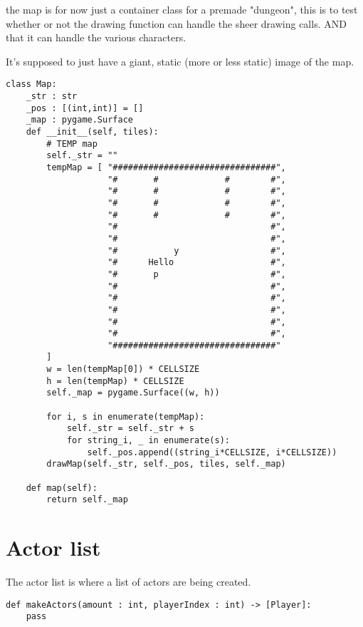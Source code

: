 \documentclass[11pt]{article}
\begin{document}
the map is for now just a container class for a premade "dungeon", this is to test whether or not the drawing function can handle the sheer drawing calls. AND that it can handle the various characters.

It's supposed to just have a giant, static (more or less static) image of the map.

\begin{verbatim}
class Map:
    _str : str
    _pos : [(int,int)] = []
    _map : pygame.Surface
    def __init__(self, tiles):
        # TEMP map
        self._str = ""
        tempMap = [ "################################",
                    "#       #             #        #",
                    "#       #             #        #",
                    "#       #             #        #",
                    "#       #             #        #",
                    "#                              #",
                    "#                              #",
                    "#           y                  #",
                    "#      Hello                   #",
                    "#       p                      #",
                    "#                              #",
                    "#                              #",
                    "#                              #",
                    "#                              #",
                    "#                              #",
                    "################################"
        ]
        w = len(tempMap[0]) * CELLSIZE
        h = len(tempMap) * CELLSIZE
        self._map = pygame.Surface((w, h))
        
        for i, s in enumerate(tempMap):
            self._str = self._str + s
            for string_i, _ in enumerate(s):
                self._pos.append((string_i*CELLSIZE, i*CELLSIZE))
        drawMap(self._str, self._pos, tiles, self._map)

    def map(self):
        return self._map
\end{verbatim}


\section{Actor list}
\label{sec:org3d99174}

The actor list is where a list of actors are being created.

\begin{verbatim}
def makeActors(amount : int, playerIndex : int) -> [Player]:
    pass
\end{verbatim}
\end{document}
